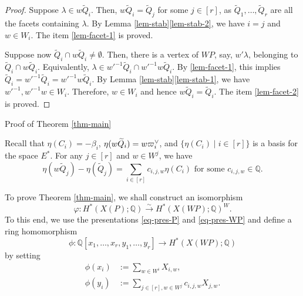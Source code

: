 \documentclass{amsart}
\makeatletter
\def\subsection{\@startsection{subsection}{2}
  \z@{.5\linespacing\@plus.7\linespacing}{.5\linespacing}
  {\normalfont\bfseries}}
\theoremstyle{definition}
\theoremstyle{remark}
\numberwithin{equation}{section}
\makeatother
\begin{document}
\begin{proof}
    Suppose $\lambda \in w \widetilde{Q}_i$.
    Then, $w \widetilde{Q}_i = \widetilde{Q}_j$ for some $j \in [r]$, as $\widetilde{Q}_1, \dots, \widetilde{Q}_r$ are all the facets containing $\lambda$.
    By Lemma \ref{lem-stab}\eqref{lem-stab-2}, we have $i = j$ and $w \in W_i$.
    The item \eqref{lem-facet-1} is proved.

    Suppose now $\widetilde{Q}_i \cap w \widetilde{Q}_i \ne \emptyset$. 
    Then, there is a vertex of $\mathit{WP}$, say, $w'\lambda$, belonging to $\widetilde{Q}_i \cap w \widetilde{Q}_i$.
    Equivalently, $\lambda \in w'^{-1} \widetilde{Q}_i \cap w'^{-1} w \widetilde{Q}_i$.
    By \eqref{lem-facet-1}, this implies $\widetilde{Q}_i = w'^{-1} \widetilde{Q}_i = w'^{-1} w \widetilde{Q}_i$.
    By Lemma \ref{lem-stab}\eqref{lem-stab-1}, we have $w'^{-1}, w'^{-1} w \in W_i$.
    Therefore, $w \in W_i$ and hence $w \widetilde{Q}_i = \widetilde{Q}_i$.
    The item \eqref{lem-facet-2} is proved.
\end{proof}

\subsection{Proof of Theorem \ref{thm-main}}

Recall that $\eta(C_i) = -\beta_i$, $\eta(w\widetilde{Q}_i) = w \varpi_i\spcheck$, and $\{\eta(C_i) \mid i \in [r]\}$ is a basis for the space $E^*$.
For any $j \in [r]$ and $w \in W^j$, we have
\begin{equation} \label{eq-cijw}
    \eta(w \widetilde{Q}_j) - \eta(\widetilde{Q}_j) = \sum_{i \in [r]} c_{i,j,w} \eta(C_i) \text{ for some } c_{i,j,w} \in \mathbb{Q}.
\end{equation}

To prove Theorem \ref{thm-main}, we shall construct an isomorphism 
\[\varphi: H^*\left(X(P) ; \mathbb{Q}\right) \xrightarrow{\sim} H^*\left(X(\mathit{WP}) ; \mathbb{Q}\right)^W.\]
To this end, we use the presentations \eqref{eq-pres-P} and \eqref{eq-pres-WP} and define a ring homomorphism
\[\phi: \mathbb{Q}[x_1, \dots, x_r, y_1, \dots, y_r] \to H^*\left(X(\mathit{WP}) ; \mathbb{Q}\right)\]
by setting
\begin{equation} \label{eq-def-of-phi}
\begin{aligned}
    \phi(x_i) & := \sum_{w \in W^i} X_{i, w}, \\
    \phi(y_i) & := \sum_{j \in [r], w \in W^j} c_{i,j,w} X_{j,w}.
\end{aligned}
\end{equation}
\end{document}
